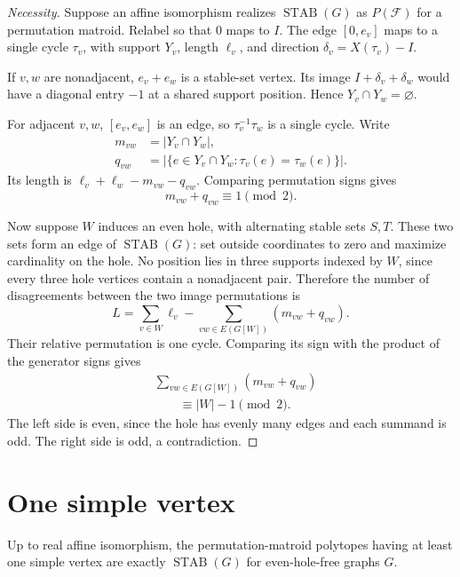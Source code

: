 \begin{proof}[Necessity]
Suppose an affine isomorphism realizes $\operatorname{STAB}(G)$
as $P(\mathcal F)$ for a permutation matroid. Relabel so that $0$
maps to $I$. The edge $[0,e_v]$ maps to a single cycle $\tau_v$,
with support $Y_v$, length $\ell_v$, and direction
$\delta_v=X(\tau_v)-I$.

If $v,w$ are nonadjacent, $e_v+e_w$ is a stable-set vertex.
Its image $I+\delta_v+\delta_w$ would have a diagonal entry $-1$
at a shared support position. Hence $Y_v\cap Y_w=\varnothing$.

For adjacent $v,w$, $[e_v,e_w]$ is an edge, so
$\tau_v^{-1}\tau_w$ is a single cycle. Write
\[
 \begin{aligned}
 m_{vw}&=|Y_v\cap Y_w|,\\
 q_{vw}&=|\{e\in Y_v\cap Y_w:\tau_v(e)=\tau_w(e)\}|.
 \end{aligned}
\]
Its length is $\ell_v+\ell_w-m_{vw}-q_{vw}$.
Comparing permutation signs gives
\[
 m_{vw}+q_{vw}\equiv1\pmod2.
\]

Now suppose $W$ induces an even hole, with alternating stable sets
$S,T$. These two sets form an edge of $\operatorname{STAB}(G)$:
set outside coordinates to zero and maximize cardinality on the hole.
No position lies in three supports indexed by $W$, since every three
hole vertices contain a nonadjacent pair. Therefore the number of
disagreements between the two image permutations is
\[
 L=\sum_{v\in W}\ell_v
   -\sum_{vw\in E(G[W])}(m_{vw}+q_{vw}).
\]
Their relative permutation is one cycle. Comparing its sign with
the product of the generator signs gives
\[
 \begin{aligned}
 &\sum_{vw\in E(G[W])}(m_{vw}+q_{vw})\\
 &\qquad\equiv |W|-1\pmod2.
 \end{aligned}
\]
The left side is even, since the hole has evenly many edges and
each summand is odd. The right side is odd, a contradiction.
\end{proof}

\section[simpleVertexClassification]{One simple vertex}

\begin{corollary}
Up to real affine isomorphism, the permutation-matroid polytopes
having at least one simple vertex are exactly
$\operatorname{STAB}(G)$ for even-hole-free graphs $G$.
\end{corollary}

